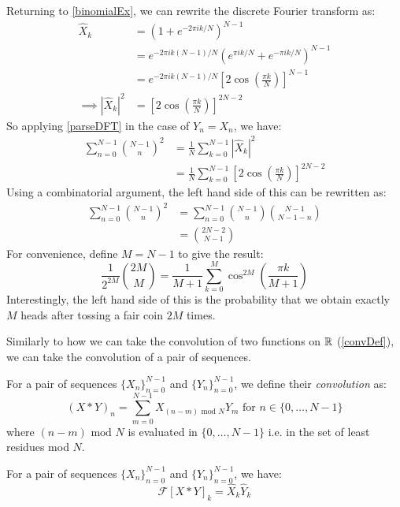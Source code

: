 \documentclass[../main.tex]{subfiles}
\begin{document}
\begin{example}
  Returning to \cref{binomialEx}, we can rewrite the discrete Fourier transform as:
  \begin{align*}
    \hat{X}_k &= (1 + e^{-2\pi i k/N})^{N-1} \\
              &= e^{-2\pi i k(N - 1)/N}(e^{\pi i k/N} + e^{-\pi i k/N})^{N - 1} \\
              &= e^{-2\pi i k(N - 1)/N}\left[2\cos\left(\frac{\pi k}{N}\right)\right]^{N - 1} \\
    \implies |\hat{X}_k|^2 &= \left[2\cos\left(\frac{\pi k}{N}\right)\right]^{2N - 2}
  \end{align*}
  So applying \cref{parseDFT} in the case of $Y_n = X_n$, we have:
  \begin{align*}
    \sum_{n = 0}^{N - 1} \binom{N - 1}{n}^{2} &= \frac{1}{N} \sum_{k = 0}^{N - 1} |\hat{X}_k|^2 \\
                                               &= \frac{1}{N} \sum_{k = 0}^{N - 1} \left[2\cos\left(\frac{\pi k}{N}\right)\right]^{2N - 2}
  \end{align*}
  Using a combinatorial argument, the left hand side of this can be rewritten as:
  \begin{align*}
    \sum_{n = 0}^{N - 1} \binom{N - 1}{n}^{2} &= \sum_{n = 0}^{N - 1} \binom{N - 1}{n} \binom{N - 1}{N - 1 - n} \\
                                              &= \binom{2N - 2}{N - 1}
  \end{align*}
  For convenience, define $M = N - 1$ to give the result:
  \[
    \frac{1}{2^{2M}} \binom{2M}{M} = \frac{1}{M + 1} \sum_{k = 0}^{M} \cos^{2M}\left(\frac{\pi k}{M + 1}\right)
  \]
  Interestingly, the left hand side of this is the probability that we obtain exactly $M$ heads after tossing a fair coin $2M$ times.
\end{example}
Similarly to how we can take the convolution of two functions on $\mathbb{R}$ (\cref{convDef}), we can take the convolution of a pair of sequences.
\begin{definition}
  For a pair of sequences $\{X_n\}_{n = 0}^{N - 1}$ and $\{Y_n\}_{n = 0}^{N - 1}$, we define their \textit{convolution} as:
  \[
    (X \ast Y)_n = \sum_{m = 0}^{N - 1} X_{(n - m)\text{ mod } N} Y_m \text{ for } n \in \{0, \ldots, N - 1\}
  \]
  where $(n - m) \text{ mod } N$ is evaluated in $\{0, \ldots, N - 1\}$ i.e. in the set of least residues mod $N$.
\end{definition}
\begin{proposition}
  For a pair of sequences $\{X_n\}_{n = 0}^{N - 1}$ and $\{Y_n\}_{n = 0}^{N - 1}$, we have:
  \[
    \mathcal{F}[X \ast Y]_k = \hat{X}_k \hat{Y}_k
  \]
\end{proposition}
\end{document}
